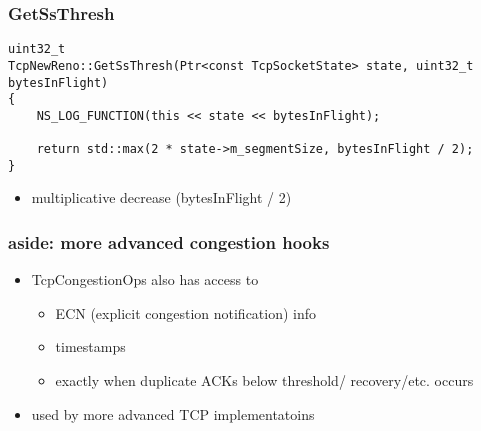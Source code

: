 \begin{FragileFrame}
\frametitle{GetSsThresh}
\begin{Verbatim}[fontsize=\fontsize{9}{10}]
uint32_t
TcpNewReno::GetSsThresh(Ptr<const TcpSocketState> state, uint32_t bytesInFlight)
{
    NS_LOG_FUNCTION(this << state << bytesInFlight);
 
    return std::max(2 * state->m_segmentSize, bytesInFlight / 2);
}
\end{Verbatim}
\begin{itemize}
\item multiplicative decrease (bytesInFlight / 2)
\end{itemize}
\end{FragileFrame}

\begin{frame}\frametitle{aside: more advanced congestion hooks}
\begin{itemize}
\item TcpCongestionOps also has access to
    \begin{itemize}
    \item ECN (explicit congestion notification) info
    \item timestamps
    \item exactly when duplicate ACKs below threshold/ recovery/etc. occurs
    \end{itemize}
\item used by more advanced TCP implementatoins
\end{itemize}
\end{frame}
